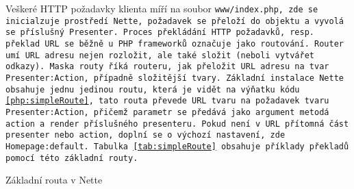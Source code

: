  \label{section:routovani}
Veškeré HTTP požadavky klienta míří na soubor \tt{www/index.php}, zde se inicialzuje prostředí Nette, požadavek se přeloží do objektu  a~vyvolá se příslušný Presenter. Proces překládání HTTP požadavků, resp. překlad URL se běžně u PHP frameworků označuje jako routování. Router umí URL adresu nejen rozložit, ale také složit (neboli vytvářet odkazy). Maska routy říká routeru, jak přeložit URL adresu na tvar \texttt{Presenter:Action}, případně složitější tvary\cite{NetteRoutovani}. Základní instalace Nette obsahuje jednu jedinou routu, která je vidět na výňatku kódu \ref{php:simpleRoute}, tato routa převede URL tvaru  na~požadavek tvaru \texttt{Presenter:Action}, přičemž parametr  se předává jako argument metodá action a render příslušného presenteru. Pokud není v URL přítomná část presenter nebo action, doplní se o výchozí nastavení, zde \texttt{Homepage:default}. Tabulka \ref{tab:simpleRoute} obsahuje příklady překladů pomocí této základní routy.
\clearpage
\begin{listing}[ht]
\caption{Základní routa v Nette}
\label{php:simpleRoute}
\end{listing}




